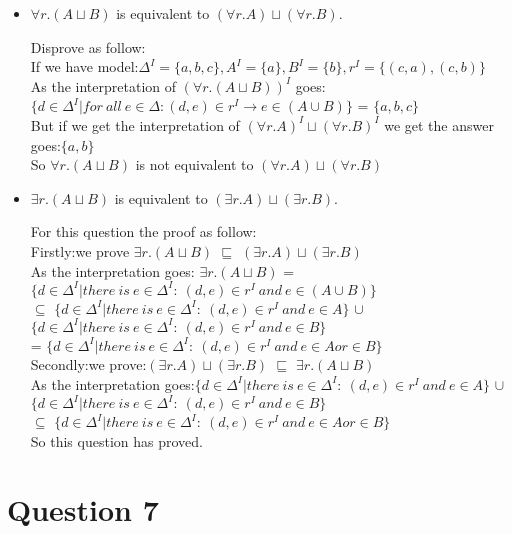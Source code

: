 \documentclass{article}
\begin{document}
\begin{itemize}
		\item $\forall r.(A\sqcup B)$ is equivalent to $(\forall r.A)\sqcup(\forall r.B)$.
		
		Disprove as follow:\\
		If we have model:$\Delta^I = \{a,b,c\} , A^I = \{a\}, B^I = \{b\}, r^I = \{(c,a),(c,b)\}$\\
		As the interpretation of $(\forall r.(A\sqcup B))^I$ goes: $\{d \in \Delta^I | for \ all \ e \in \Delta: (d,e) \in r^I \rightarrow e \in (A \cup B)\}$ = $\{a,b,c\}$\\
		But if we get the interpretation of $(\forall r.A)^I\sqcup(\forall r.B)^I$ we get the answer goes:$\{a,b\}$\\
		So $\forall r.(A\sqcup B)$ is not equivalent to $(\forall r.A)\sqcup(\forall r.B)$

		\item $\exists r.(A\sqcup B)$ is equivalent to $(\exists r.A)\sqcup(\exists r.B)$.
		
		For this question the proof as follow:\\
		Firstly:we prove $\exists r.(A\sqcup B)$ $\sqsubseteq $ $(\exists r.A)\sqcup(\exists r.B)$\\
		As the interpretation goes:  $\exists r.(A\sqcup B)$ = $\{d \in \Delta^I | there \ is \ e \in \Delta^I:\ (d,e) \in r^I \ and \ e \in (A \cup B) \}$\\
		$\subseteq$ $\{d \in \Delta^I | there \ is \ e \in \Delta^I:\ (d,e) \in r^I \ and \ e \in A\}$ $\cup$ $\{d \in \Delta^I | there \ is \ e \in \Delta^I:\ (d,e) \in r^I \ and \ e \in B  \}$\\
		= $\{d \in \Delta^I | there \ is \ e \in \Delta^I:\ (d,e) \in r^I \ and \ e \in A or \in B \}$\\

		Secondly:we prove:$(\exists r.A)\sqcup(\exists r.B)$ $\sqsubseteq $ $\exists r.(A\sqcup B)$\\
		As the interpretation goes:$\{d \in \Delta^I | there \ is \ e \in \Delta^I:\ (d,e) \in r^I \ and \ e \in A\}$ $\cup$ $\{d \in \Delta^I | there \ is \ e \in \Delta^I:\ (d,e) \in r^I \ and \ e \in B  \}$\\
		$\subseteq$ $\{d \in \Delta^I | there \ is \ e \in \Delta^I:\ (d,e) \in r^I \ and \ e \in A or \in B \}$\\

		So this question has proved.

	\end{itemize}

	\section{Question 7}
\end{document}
